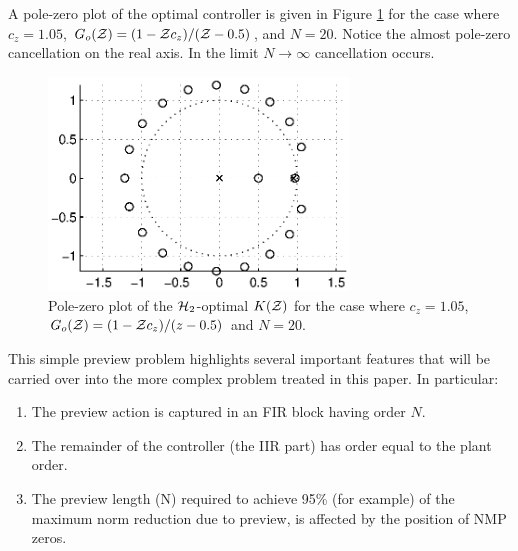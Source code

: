 A pole-zero plot of the optimal controller is given in Figure \ref{fig:PZforSISOPrevH2} for the case where $c_z=1.05$, $G_o(\mathcal{Z})=(1-\mathcal{Z} c_z)/(\mathcal{Z}-0.5)$, and $N=20$. Notice the almost pole-zero cancellation on the real axis. In the limit $N\rightarrow \infty$ cancellation occurs. 
\begin{figure}
\begin{center}
\includegraphics[width=8cm]{./diags/SimpleExamplePZPlot2.eps}
\end{center}
\caption{Pole-zero plot of the $\mathcal H_2$-optimal $K(\mathcal{Z})$ for the case where $c_z=1.05$, $G_o(\mathcal{Z})=(1-\mathcal{Z} c_z)/(z-0.5)$ and $N=20$.   }
\label{fig:PZforSISOPrevH2}
\end{figure}
This simple preview problem highlights several important features that will be carried over into the more complex problem treated in this paper. In particular:
\begin{enumerate}
\item The preview action is captured in an {FIR} block having order $N$.
\item The remainder of the controller (the {IIR} part) has order equal to the plant order.
\item The preview length (N) required to achieve 95\% (for example) of the maximum norm reduction due to preview, is affected by the position of {NMP} zeros. 
\end{enumerate} 

